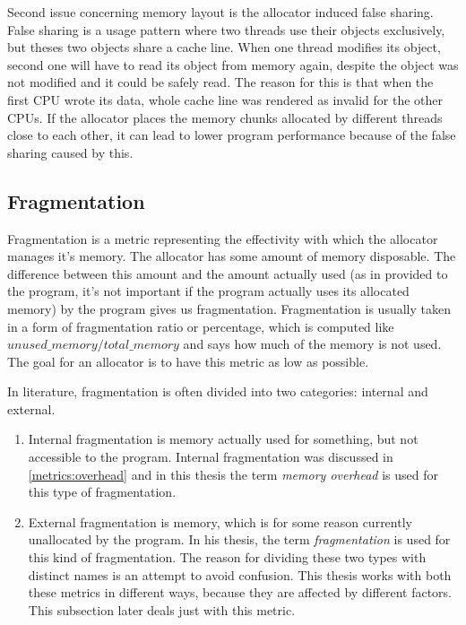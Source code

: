 Second issue concerning memory layout is the allocator induced false sharing. False sharing is a usage pattern where two threads use their objects exclusively, but theses two objects share a cache line. When one thread modifies its object, second one will have to read its object from memory again, despite the object was not modified and it could be safely read. The reason for this is that when the first CPU wrote its data, whole cache line was rendered as invalid for the other CPUs. If the allocator places the memory chunks allocated by different threads close to each other, it can lead to lower program performance because of the false sharing caused by this.

\subsection{Fragmentation}
\label{metrics:fragmentation}

Fragmentation is a metric representing the effectivity with which the allocator manages it's memory. The allocator has some amount of memory disposable. The difference between this amount and the amount actually used (as in provided to the program, it's not important if the program actually uses its allocated memory) by the program gives us fragmentation. Fragmentation is usually taken in a form of fragmentation ratio or percentage, which is computed like $unused\_memory / total\_memory$ and says how much of the memory is not used. The goal for an allocator is to have this metric as low as possible.

In literature, fragmentation is often divided into two categories: internal and external.
\begin{enumerate}
\item Internal fragmentation is memory actually used for something, but not accessible to the program. Internal fragmentation was discussed in \ref{metrics:overhead} and in this thesis the term {\em memory overhead} is used for this type of fragmentation.
\item External fragmentation is memory, which is for some reason currently unallocated by the program. In his thesis, the term {\em fragmentation} is used for this kind of fragmentation. The reason for dividing these two types with distinct names is an attempt to avoid confusion. This thesis works with both these metrics in different ways, because they are affected by different factors. This subsection later deals just with this metric.
\end{enumerate}


